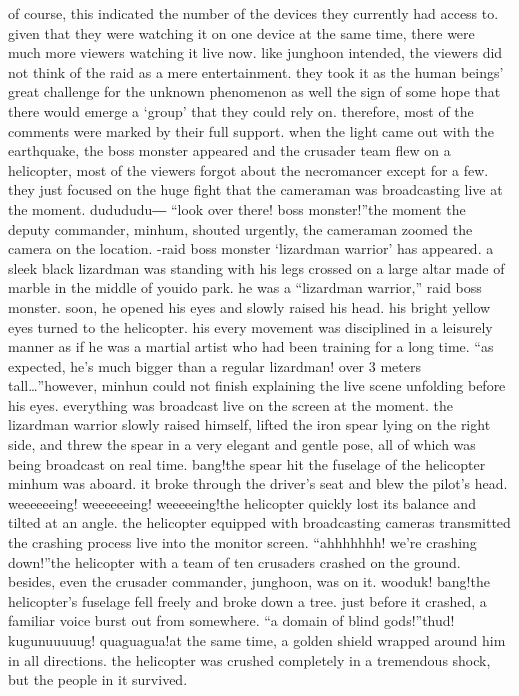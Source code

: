 of course, this indicated the number of the devices they currently had access to.
 given that they were watching it on one device at the same time, there were much more viewers watching it live now.
like junghoon intended, the viewers did not think of the raid as a mere entertainment.
they took it as the human beings’ great challenge for the unknown phenomenon as well the sign of some hope that there would emerge a ‘group’ that they could rely on.
therefore, most of the comments were marked by their full support.
 when the light came out with the earthquake, the boss monster appeared and the crusader team flew on a helicopter, most of the viewers forgot about the necromancer except for a few.
they just focused on the huge fight that the cameraman was broadcasting live at the moment.
dudududu―
“look over there! boss monster!”the moment the deputy commander, minhum, shouted urgently, the cameraman zoomed the camera on the location.
-raid boss monster ‘lizardman warrior’ has appeared.
a sleek black lizardman was standing with his legs crossed on a large altar made of marble in the middle of youido park.
he was a “lizardman warrior,” raid boss monster.
 soon, he opened his eyes and slowly raised his head.
 his bright yellow eyes turned to the helicopter.
his every movement was disciplined in a leisurely manner as if he was a martial artist who had been training for a long time.
“as expected, he’s much bigger than a regular lizardman! over 3 meters tall…”however, minhun could not finish explaining the live scene unfolding before his eyes.
everything was broadcast live on the screen at the moment.
the lizardman warrior slowly raised himself, lifted the iron spear lying on the right side, and threw the spear in a very elegant and gentle pose, all of which was being broadcast on real time.
bang!the spear hit the fuselage of the helicopter minhum was aboard.
 it broke through the driver’s seat and blew the pilot’s head.
weeeeeeing! weeeeeeing! weeeeeing!the helicopter quickly lost its balance and tilted at an angle.
 the helicopter equipped with broadcasting cameras transmitted the crashing process live into the monitor screen.
“ahhhhhhh! we’re crashing down!”the helicopter with a team of ten crusaders crashed on the ground.
 besides, even the crusader commander, junghoon, was on it.
wooduk! bang!the helicopter’s fuselage fell freely and broke down a tree.
 just before it crashed, a familiar voice burst out from somewhere.
“a domain of blind gods!”thud! kugunuuuuug! quaguagua!at the same time, a golden shield wrapped around him in all directions.
 the helicopter was crushed completely in a tremendous shock, but the people in it survived.
